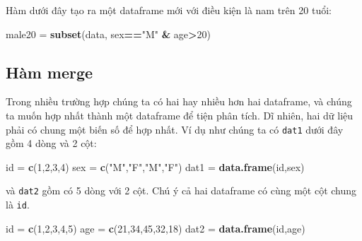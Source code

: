 \documentclass[
]{book}
\newenvironment{Shaded}{\begin{snugshade}}{\end{snugshade}}
\newcommand{\DecValTok}[1]{\textcolor[rgb]{0.00,0.00,0.81}{#1}}
\newcommand{\KeywordTok}[1]{\textcolor[rgb]{0.13,0.29,0.53}{\textbf{#1}}}
\newcommand{\NormalTok}[1]{#1}
\newcommand{\OperatorTok}[1]{\textcolor[rgb]{0.81,0.36,0.00}{\textbf{#1}}}
\newcommand{\StringTok}[1]{\textcolor[rgb]{0.31,0.60,0.02}{#1}}
\begin{document}
Hàm dưới đây tạo ra một dataframe mới với điều kiện là nam trên 20 tuổi:

\begin{Shaded}
\begin{Highlighting}[]
\NormalTok{male20 =}\StringTok{ }\KeywordTok{subset}\NormalTok{(data, sex}\OperatorTok{==}\StringTok{"M"} \OperatorTok{\&}\StringTok{ }\NormalTok{age}\OperatorTok{\textgreater{}}\DecValTok{20}\NormalTok{)}
\end{Highlighting}
\end{Shaded}

\hypertarget{huxe0m-merge}{%
\subsection{Hàm merge}\label{huxe0m-merge}}

Trong nhiều trường hợp chúng ta có hai hay nhiều hơn hai dataframe, và chúng ta muốn hợp nhất thành một dataframe để tiện phân tích. Dĩ nhiên, hai dữ liệu phải có chung một biến số để hợp nhất. Ví dụ như chúng ta có \texttt{dat1} dưới đây gồm 4 dòng và 2 cột:

\begin{Shaded}
\begin{Highlighting}[]
\NormalTok{id =}\StringTok{ }\KeywordTok{c}\NormalTok{(}\DecValTok{1}\NormalTok{,}\DecValTok{2}\NormalTok{,}\DecValTok{3}\NormalTok{,}\DecValTok{4}\NormalTok{)}
\NormalTok{sex =}\StringTok{ }\KeywordTok{c}\NormalTok{(}\StringTok{"M"}\NormalTok{,}\StringTok{"F"}\NormalTok{,}\StringTok{"M"}\NormalTok{,}\StringTok{"F"}\NormalTok{)}
\NormalTok{dat1 =}\StringTok{ }\KeywordTok{data.frame}\NormalTok{(id,sex)}
\end{Highlighting}
\end{Shaded}

và \texttt{dat2} gồm có 5 dòng với 2 cột. Chú ý cả hai dataframe có cùng một cột chung là \texttt{id}.

\begin{Shaded}
\begin{Highlighting}[]
\NormalTok{id =}\StringTok{ }\KeywordTok{c}\NormalTok{(}\DecValTok{1}\NormalTok{,}\DecValTok{2}\NormalTok{,}\DecValTok{3}\NormalTok{,}\DecValTok{4}\NormalTok{,}\DecValTok{5}\NormalTok{)}
\NormalTok{age =}\StringTok{ }\KeywordTok{c}\NormalTok{(}\DecValTok{21}\NormalTok{,}\DecValTok{34}\NormalTok{,}\DecValTok{45}\NormalTok{,}\DecValTok{32}\NormalTok{,}\DecValTok{18}\NormalTok{)}
\NormalTok{dat2 =}\StringTok{ }\KeywordTok{data.frame}\NormalTok{(id,age)}
\end{Highlighting}
\end{Shaded}
\end{document}
